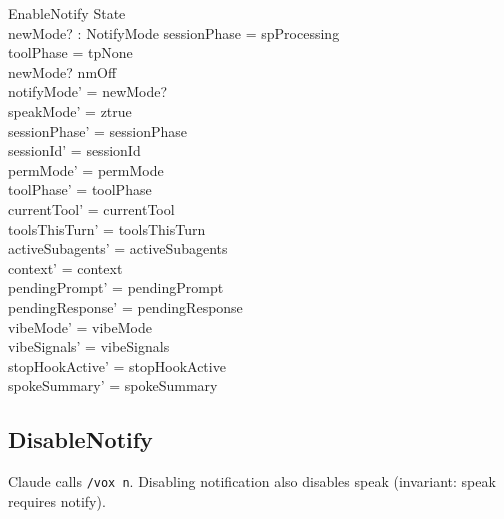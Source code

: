 \documentclass[a4paper,10pt,fleqn]{article}
\begin{document}
\begin{schema}{EnableNotify}
  \Delta State \\
  newMode? : NotifyMode
  \where
  sessionPhase = spProcessing \\
  toolPhase = tpNone \\
  newMode? \neq nmOff \\
  notifyMode' = newMode? \\
  speakMode' = ztrue \\
  sessionPhase' = sessionPhase \\
  sessionId' = sessionId \\
  permMode' = permMode \\
  toolPhase' = toolPhase \\
  currentTool' = currentTool \\
  toolsThisTurn' = toolsThisTurn \\
  activeSubagents' = activeSubagents \\
  context' = context \\
  pendingPrompt' = pendingPrompt \\
  pendingResponse' = pendingResponse \\
  vibeMode' = vibeMode \\
  vibeSignals' = vibeSignals \\
  stopHookActive' = stopHookActive \\
  spokeSummary' = spokeSummary
\end{schema}

\subsection{DisableNotify}

Claude calls \texttt{/vox n}. Disabling notification also disables
speak (invariant: speak requires notify).
\end{document}
